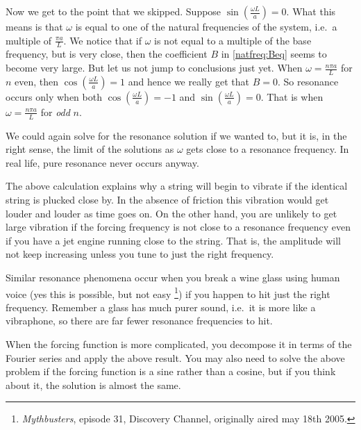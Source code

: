 Now we get to the point that we skipped.  Suppose 
$\sin ( \frac{\omega L}{a} ) = 0$.  What this means is that
$\omega$ is equal to one of the natural frequencies of the system,
i.e.\ a multiple of $\frac{\pi a}{L}$.  We notice that if $\omega$
is not equal to a multiple of the base frequency, but is very close,
then the coefficient $B$ in \eqref{natfreq:Beq} seems to
become very large.  But let us not jump to conclusions just yet.
When $\omega = \frac{n \pi a}{L}$
for $n$ even, then $\cos (\frac{\omega L}{a}) = 1$ and hence we really get that
$B=0$.  So resonance occurs only when 
both $\cos (\frac{\omega L}{a}) = -1$ and
$\sin (\frac{\omega L}{a}) = 0$.  That is when $\omega = \frac{n \pi a }{L}$
for \emph{odd} $n$.

We could again solve for the resonance solution if we wanted to, but it is, in the right sense, the limit of the solutions as $\omega$ gets
close to a resonance frequency.
In real life, pure resonance never occurs anyway.

The above calculation explains why a string will begin to vibrate if the
identical string is plucked close by.  In the absence of friction this vibration
would get louder and louder as time goes on.
On the other hand, you are unlikely to get large vibration if the forcing 
frequency is not close to a resonance frequency even if you have a jet engine
running close to
the string.  That is, the amplitude will not keep
increasing unless you tune to just the right frequency.

Similar resonance phenomena occur when you break a wine glass using human
voice (yes
this is possible, but not easy%
\footnote{\emph{Mythbusters}, episode 31, Discovery Channel, originally aired
may 18th 2005.}) if you happen to hit just the right
frequency.  Remember a glass has much purer sound, i.e.\ it is more like a
vibraphone, so there are far fewer resonance frequencies to hit.

When the forcing function is more complicated, you decompose it in terms of
the Fourier series and apply the above result.  You may also need to solve
the above problem if the forcing function is a sine rather than a cosine,
but if you think about it, the solution is almost the same.


